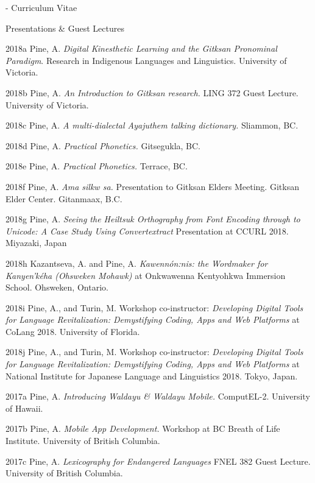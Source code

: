 \documentclass[12pt]{letter}
\begin{document}
\begin{cv}{     \space - \space   Curriculum Vitae}
        \begin{cvlist}{Presentations \& Guest Lectures}
            \item[2018a] Pine, A. \textit{Digital Kinesthetic Learning and the Gitksan Pronominal Paradigm}. Research in Indigenous Languages and Linguistics. University of Victoria.
            \item[2018b] Pine, A. \textit{An Introduction to Gitksan research.} LING 372 Guest Lecture. University of Victoria.
            \item[2018c] Pine, A. \textit{A multi-dialectal Ayajuthem talking dictionary.} Sliammon, BC.
            \item[2018d] Pine, A. \textit{Practical Phonetics.} Gitsegukla, BC.
            \item[2018e] Pine, A. \textit{Practical Phonetics.} Terrace, BC.
            \item[2018f] Pine, A. \textit{Ama silkw sa.} Presentation to Gitksan Elders Meeting. Gitksan Elder Center. Gitanmaax, B.C.
            \item[2018g] Pine, A. \textit{Seeing the Heiltsuk Orthography from Font Encoding through to Unicode: A Case Study Using Convertextract} Presentation at CCURL 2018. Miyazaki, Japan
            \item[2018h] Kazantseva, A. and Pine, A. \textit{Kawenn\'{o}n:nis: the Wordmaker for Kanyen'k\'{e}ha (Ohsweken Mohawk)} at Onkwawenna Kentyohkwa Immersion School. Ohsweken, Ontario.
            \item[2018i] Pine, A., and Turin, M. Workshop co-instructor: \textit{Developing Digital Tools for Language Revitalization: Demystifying Coding, Apps and Web Platforms} at CoLang 2018. University of Florida.
            \item[2018j] Pine, A., and Turin, M. Workshop co-instructor: \textit{Developing Digital Tools for Language Revitalization: Demystifying Coding, Apps and Web Platforms} at National Institute for Japanese Language and Linguistics 2018. Tokyo, Japan.
            \item[2017a] Pine, A. \textit{Introducing Waldayu \& Waldayu Mobile.} ComputEL-2. University of Hawaii.
            \item[2017b] Pine, A. \textit{Mobile App Development.} Workshop at BC Breath of Life Institute. University of British Columbia.
            \item[2017c] Pine, A. \textit{Lexicography for Endangered Languages}  FNEL 382 Guest Lecture. University of British Columbia.

\end{cvlist}
\end{cv}
\end{document}
